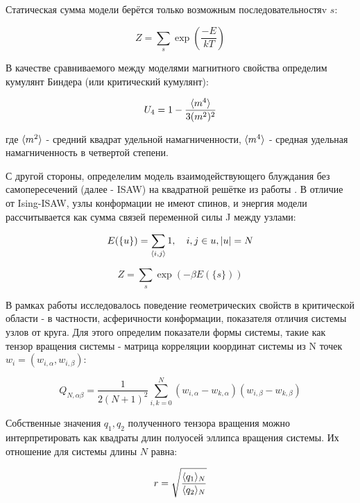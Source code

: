 Статическая сумма модели берётся только возможным последовательностяv ${s}$:

\begin{equation}
Z = \sum_s \exp{(\frac{-E}{kT})}
\end{equation}

В качестве сравниваемого между моделями магнитного свойства определим кумулянт Биндера (или критический кумулянт):

\begin{equation}
\label{eq:Cumulant}
U_{4} = 1 - \frac{\langle m^{4} \rangle}{3 (m^{2})^{2}}
\end{equation}

где $\langle m^{2} \rangle$  - средний квадрат удельной намагниченности, $\langle m^{4} \rangle$ - средная удельная намагниченность в четвертой степени. 

С другой стороны, определелим модель взаимодействующего блуждания без самопересечений (далее - ISAW) на квадратной решётке из работы \cite{caracciolo2011geometrical}.
В отличие от Ising-ISAW, узлы конформации не имеют спинов, и энергия модели рассчитывается как сумма связей переменной силы J между узлами:

\begin{equation}
E(\{u\}) = \sum_{\la i, j \ra} 1,\ \ \ i,j \in u, |u|=N
\end{equation}

\begin{equation}
Z = \sum_s \exp{(- \beta E(\{s\}))}
\end{equation}

В рамках работы \cite{caracciolo2011geometrical} исследовалось поведение геометрических свойств в критической области - в частности, асферичности конформации, показателя отличия системы узлов от круга.
Для этого определим показатели формы системы, такие как тензор вращения системы - матрица корреляции координат системы из N точек $w_i = (w_{i,\alpha}, w_{i,\beta})$:

\begin{equation}\label{eq:Ten_G2}
    Q_{N,\alpha\beta} = \frac{1}{2(N+1)^{2}} \sum^{N}_{i,k=0}(w_{i,\alpha} - w_{k, \alpha})(w_{i,\beta} - w_{k, \beta})
\end{equation}

Собственные значения $q_1, q_2$ полученного тензора вращения можно интерпретировать как квадраты длин полуосей эллипса вращения системы.
Их отношение для системы длины $N$ равна:

\begin{equation}
r = \sqrt{\frac{\langle q_1 \rangle_N}{\langle q_2 \rangle_N}}
\end{equation}

